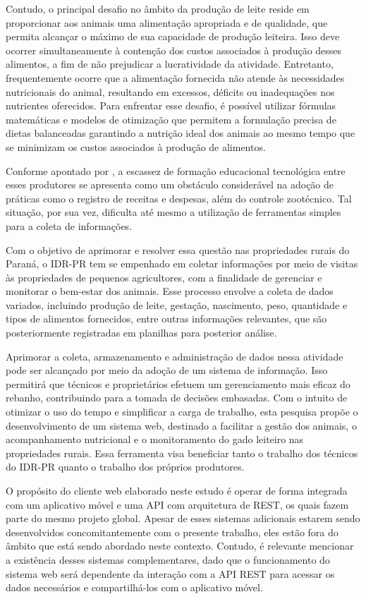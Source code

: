 Contudo, o principal desafio no âmbito da produção de leite reside em proporcionar aos animais uma alimentação apropriada e de qualidade, que permita alcançar o máximo de sua capacidade de produção leiteira. Isso deve ocorrer simultaneamente à contenção dos custos associados à produção desses alimentos, a fim de não prejudicar a lucratividade da atividade. Entretanto, frequentemente ocorre que a alimentação fornecida não atende às necessidades nutricionais do animal, resultando em excessos, déficits ou inadequações nos nutrientes oferecidos. Para enfrentar esse desafio, é possível utilizar fórmulas matemáticas e modelos de otimização que permitem a formulação precisa de dietas balanceadas garantindo a nutrição ideal dos animais ao mesmo tempo que se minimizam os custos associados à produção de alimentos.

Conforme apontado por , a escassez de formação educacional tecnológica entre esses produtores se apresenta como um obstáculo considerável na adoção de práticas como o registro de receitas e despesas, além do controle zootécnico. Tal situação, por sua vez, dificulta até mesmo a utilização de ferramentas simples para a coleta de informações.

Com o objetivo de aprimorar e resolver essa questão nas propriedades rurais do Paraná, o \gls{IDR-PR} tem se empenhado em coletar informações por meio de visitas às propriedades de pequenos agricultores, com a finalidade de gerenciar e monitorar o bem-estar dos animais. Esse processo envolve a coleta de dados variados, incluindo produção de leite, gestação, nascimento, peso, quantidade e tipos de alimentos fornecidos, entre outras informações relevantes, que são posteriormente registradas em planilhas para posterior análise.

Aprimorar a coleta, armazenamento e administração de dados nessa atividade pode ser alcançado por meio da adoção de um sistema de informação. Isso permitirá que técnicos e proprietários efetuem um gerenciamento mais eficaz do rebanho, contribuindo para a tomada de decisões embasadas. Com o intuito de otimizar o uso do tempo e simplificar a carga de trabalho, esta pesquisa propõe o desenvolvimento de um sistema web, destinado a facilitar a gestão dos animais, o acompanhamento nutricional e o monitoramento do gado leiteiro nas propriedades rurais. Essa ferramenta visa beneficiar tanto o trabalho dos técnicos do \gls{IDR-PR} quanto o trabalho dos próprios produtores.

O propósito do cliente web elaborado neste estudo é operar de forma integrada com um aplicativo móvel e uma \gls{API} com arquitetura de \gls{REST}, os quais fazem parte do mesmo projeto global. Apesar de esses sistemas adicionais estarem sendo desenvolvidos concomitantemente com o presente trabalho, eles estão fora do âmbito que está sendo abordado neste contexto. Contudo, é relevante mencionar a existência desses sistemas complementares, dado que o funcionamento do sistema web será dependente da interação com a \gls{API} \gls{REST} para acessar os dados necessários e compartilhá-los com o aplicativo móvel.

